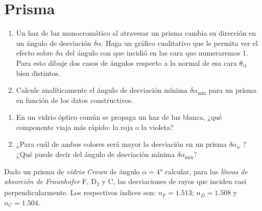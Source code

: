 \section*{Prisma}

\item
\begin{enumerate}
	\item Un haz de luz monocromático al atravesar un prisma cambia su dirección en un ángulo de desviación \(\delta \alpha\).
	Haga un gráfico cualitativo que le permita ver el efecto sobre \(\delta \alpha\) del ángulo con que incidió en las cara que numeraremos 1.
	Para esto dibuje dos casos de ángulos respecto a la normal de esa cara \(\theta_{i1}\) bien distintos.
	\item Calcule analíticamente el ángulo de desviación mínima \(\delta \alpha_\text{mín}\) para un prisma en función de los datos constructivos.
\end{enumerate}


\item
\begin{enumerate}
	\item En un vidrio óptico común se propaga un haz de luz blanca, ¿qué componente viaja más rápido: la roja o la violeta?
	\item ¿Para cuál de ambos colores será mayor la desviación en un prisma \(\delta \alpha_n\) ?
	¿Qué puede decir del ángulo de desviación mínima \(\delta \alpha_\text{mín}\)?
\end{enumerate}



\item Dado un prisma de \emph{vidrio Crown} de ángulo $\alpha = \ang{4;;}$ calcular, para las \emph{líneas de absorción de Fraunhofer} F, D\textsubscript{1} y C, las desviaciones de rayos que inciden casi perpendicularmente.
Los respectivos índices son: $n_F = 1.513$; $n_D = 1.508$ y $n_C =1.504$.
